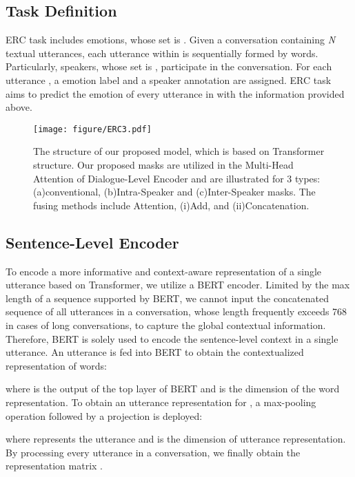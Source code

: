 \documentclass[letterpaper]{article} \usepackage{aaai21}  \usepackage{times}  \usepackage{helvet} \usepackage{courier}  \usepackage[hyphens]{url}  \usepackage{graphicx} \urlstyle{rm} \def\UrlFont{\rm}  \usepackage{natbib}  \usepackage{caption} \usepackage{multirow}
\begin{document}
\subsection{Task Definition}

ERC task includes  emotions, whose set is . Given a conversation  containing \textit{N} textual utterances, each utterance  within is sequentially formed by  words. Particularly,  speakers, whose set is , participate in the conversation. For each utterance , a emotion label  and a speaker annotation  are assigned. ERC task aims to predict the emotion of every utterance in  with the information provided above. 



\begin{figure*}
    \centering
    \texttt{[image: figure/ERC3.pdf]}
    \caption{The structure of our proposed model, which is based on Transformer structure. Our proposed masks are utilized in the Multi-Head Attention of Dialogue-Level Encoder and are illustrated for 3 types: (a)conventional, (b)Intra-Speaker and (c)Inter-Speaker masks. The fusing methods include Attention, (i)Add, and (ii)Concatenation.  }
    \label{fig: model}
\end{figure*}

\subsection{Sentence-Level Encoder}

To encode a more informative and context-aware representation of a single utterance based on Transformer, we utilize a BERT encoder. Limited by the max length of a sequence supported by BERT, we cannot input the concatenated sequence of all utterances in a conversation, whose length frequently exceeds 768 in cases of long conversations, to capture the global contextual information. Therefore, BERT is solely used to encode the sentence-level context in a single utterance. An utterance  is fed into BERT to obtain the contextualized representation of words:

where  is the output of the top layer of BERT and  is the dimension of the word representation. To obtain an utterance representation for , a max-pooling operation followed by a projection is deployed: 

where  represents the utterance and  is the dimension of utterance representation. By processing every utterance in a conversation, we finally obtain the representation matrix .
\end{document}
